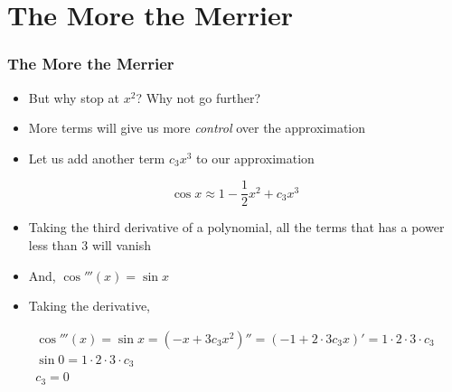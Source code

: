 \documentclass{beamer}
\begin{document}

\section{The More the Merrier}

\begin{frame}
  \frametitle{The More the Merrier}
  \begin{itemize}
    \item But why stop at \( x^2 \)? Why not go further?
    \item More terms will give us more \textit{control} over the approximation
    \item Let us add another term \( c_3x^3 \) to our approximation
  \end{itemize}
  \begin{equation*}
    \cos x \approx 1 - \frac{1}{2}x^2 + c_3x^3
  \end{equation*}
  \begin{itemize}
    \item Taking the third derivative of a polynomial, all the terms that has a power less than 3 will vanish
    \item And, \( \cos'''(x) = \sin x \)
    \item Taking the derivative,
  \end{itemize}
  \begin{gather*}
    \cos'''(x) = \sin x = \left(-x + 3c_3x^2\right)'' = \left(-1 + 2 \cdot 3c_3x\right)' = 1 \cdot 2 \cdot 3 \cdot c_3 \\
    \sin 0 = 1 \cdot 2 \cdot 3 \cdot c_3 \\
    c_3 = 0
  \end{gather*}
\end{frame}
\end{document}
